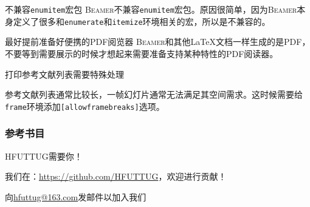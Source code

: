 \documentclass[aspectratio=169]{beamer}
\newcommand{\Beamer}{\textsc{Beamer}}
\newcommand{\enableindent}{\setlength{\parskip}{6pt}\setlength{\parindent}{2em}}
\begin{document}
\begin{frame}{不兼容\texttt{enumitem}宏包}
	\enableindent
	\Beamer 不兼容\texttt{enumitem}宏包。原因很简单，因为\Beamer 本身定义了很多和\texttt{enumerate}和\texttt{itemize}环境相关的宏，所以是不兼容的。
\end{frame}

\begin{frame}{最好提前准备好便携的PDF阅览器}
	\enableindent
	\Beamer 和其他\LaTeX 文档一样生成的是PDF，不要等到需要展示的时候才想起来需要准备支持某种特性的PDF阅读器。
\end{frame}

\begin{frame}{打印参考文献列表需要特殊处理}

	参考文献列表通常比较长，一帧幻灯片通常无法满足其空间需求。这时候需要给\texttt{frame}环境添加\texttt{[allowframebreaks]}选项。
\end{frame}

\begin{frame}[allowframebreaks]
	\frametitle{参考书目}
	{
		\tiny
		\nocite{*}
		\printbibliography[heading=none]
	}
\end{frame}

\begin{frame}{HFUTTUG需要你！}
	\centering

	我们在：\url{https://github.com/HFUTTUG}，欢迎进行贡献！

	向\href{mailto:hfuttug@163.com}{hfuttug@163.com}发邮件以加入我们
\end{frame}
\end{document}
